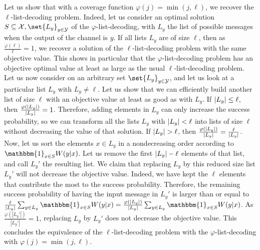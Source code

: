 Let us show that with a coverage function $\varphi(j) = \min(j,\ell)$, we recover the $\ell$-list-decoding problem. Indeed, let us consider an optimal solution $S \subseteq \mathcal{X},\set{L_y}_{y \in \mathcal{Y}}$ of the $\varphi$-list-decoding, with $L_y$ the list of possible messages when the output of the channel is $y$. If all lists $L_y$ are of size $\ell$, then as $\frac{\varphi(\ell)}{\ell} = 1$, we recover a solution of the $\ell$-list-decoding problem with the same objective value. This shows in particular that the $\varphi$-list-decoding problem has an objective optimal value at least as large as the usual $\ell$-list-decoding problem. Let us now consider on an arbitrary set $\set{L_y}_{y \in \mathcal{Y}}$, and let us look at a particular list $L_y$ with $L_y \not= \ell$. Let us show that we can efficiently build another list of size $\ell$ with an objective value at least as good as with $L_y$. If $\abs{L_y} \leq \ell$, then $\frac{\varphi(\abs{L_y})}{\abs{L_y}} = 1$. Therefore, adding elements in $L_y$ can only increase the success probability, so we can transform all the lists $L_y$ with $\abs{L_y} < \ell$ into lists of size $\ell$ without decreasing the value of that solution. If $\abs{L_y} > \ell$, then $\frac{\varphi(\abs{L_y})}{\abs{L_y}} = \frac{\ell}{\abs{L_y}}$. Now, let us sort the elements $x \in L_y$ in a nondecreasing order according to $\mathbbm{1}_{x \in S}W(y|x)$. Let us remove the first $\abs{L_y} - \ell$ elements of that list, and call $L_y'$ the resulting list. We claim that replacing $L_y$ by this reduced size list $L_y'$ will not decrease the objective value. Indeed, we have kept the $\ell$ elements that contribute the most to the success probability. Therefore, the remaining success probability of having the input message in $L_y'$ is larger than or equal to $\frac{\ell}{\abs{L_y}}\sum_{y \in L_y}\mathbbm{1}_{x \in S}W(y|x) = \frac{\varphi(\abs{L_y})}{\abs{L_y}}\sum_{y \in L_y}\mathbbm{1}_{x \in S}W(y|x)$.  As $\frac{\varphi(|L_y'|)}{|L_y'|} = 1$, replacing $L_y$ by $L_y'$ does not decrease the objective value. This concludes the equivalence of the $\ell$-list-decoding problem with the $\varphi$-list-decoding with $\varphi(j) = \min(j,\ell)$.

